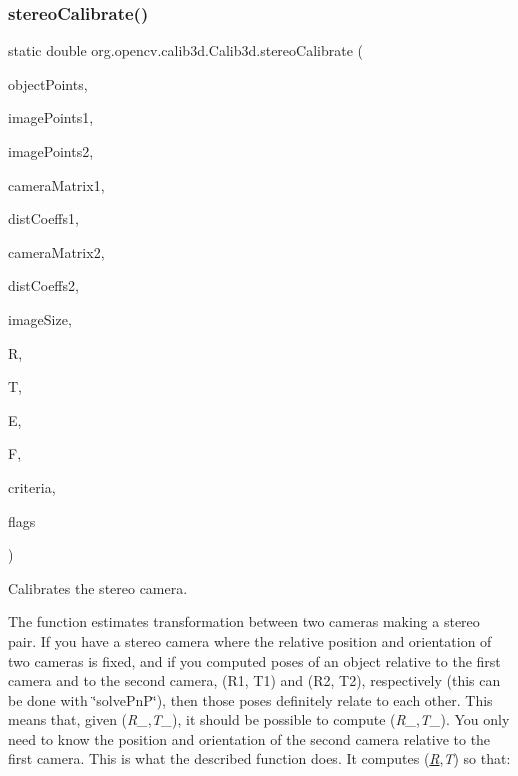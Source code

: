 \subsubsection{\texorpdfstring{stereo\+Calibrate()}{stereoCalibrate()}\hspace{0.1cm}{\footnotesize\ttfamily [1/2]}}
{\footnotesize\ttfamily static double org.\+opencv.\+calib3d.\+Calib3d.\+stereo\+Calibrate (\begin{DoxyParamCaption}\item[{List$<$ \mbox{\hyperlink{classorg_1_1opencv_1_1core_1_1_mat}{Mat}} $>$}]{object\+Points,  }\item[{List$<$ \mbox{\hyperlink{classorg_1_1opencv_1_1core_1_1_mat}{Mat}} $>$}]{image\+Points1,  }\item[{List$<$ \mbox{\hyperlink{classorg_1_1opencv_1_1core_1_1_mat}{Mat}} $>$}]{image\+Points2,  }\item[{\mbox{\hyperlink{classorg_1_1opencv_1_1core_1_1_mat}{Mat}}}]{camera\+Matrix1,  }\item[{\mbox{\hyperlink{classorg_1_1opencv_1_1core_1_1_mat}{Mat}}}]{dist\+Coeffs1,  }\item[{\mbox{\hyperlink{classorg_1_1opencv_1_1core_1_1_mat}{Mat}}}]{camera\+Matrix2,  }\item[{\mbox{\hyperlink{classorg_1_1opencv_1_1core_1_1_mat}{Mat}}}]{dist\+Coeffs2,  }\item[{\mbox{\hyperlink{classorg_1_1opencv_1_1core_1_1_size}{Size}}}]{image\+Size,  }\item[{\mbox{\hyperlink{classorg_1_1opencv_1_1core_1_1_mat}{Mat}}}]{R,  }\item[{\mbox{\hyperlink{classorg_1_1opencv_1_1core_1_1_mat}{Mat}}}]{T,  }\item[{\mbox{\hyperlink{classorg_1_1opencv_1_1core_1_1_mat}{Mat}}}]{E,  }\item[{\mbox{\hyperlink{classorg_1_1opencv_1_1core_1_1_mat}{Mat}}}]{F,  }\item[{\mbox{\hyperlink{classorg_1_1opencv_1_1core_1_1_term_criteria}{Term\+Criteria}}}]{criteria,  }\item[{int}]{flags }\end{DoxyParamCaption})\hspace{0.3cm}{\ttfamily [static]}}

Calibrates the stereo camera.

The function estimates transformation between two cameras making a stereo pair. If you have a stereo camera where the relative position and orientation of two cameras is fixed, and if you computed poses of an object relative to the first camera and to the second camera, (R1, T1) and (R2, T2), respectively (this can be done with \char`\"{}solve\+Pn\+P\char`\"{}), then those poses definitely relate to each other. This means that, given ({\itshape R\+\_},{\itshape T\+\_}), it should be possible to compute ({\itshape R\+\_},{\itshape T\+\_}). You only need to know the position and orientation of the second camera relative to the first camera. This is what the described function does. It computes ({\itshape \mbox{\hyperlink{classorg_1_1opencv_1_1_r}{R}}},{\itshape T}) so that\+:

